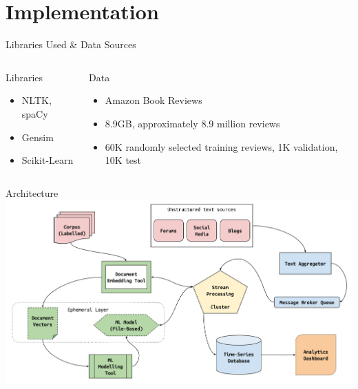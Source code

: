 \documentclass[aspectratio=169]{beamer}
\begin{document}
\section{Implementation}

\begin{frame}{Libraries Used \& Data Sources}
	\begin{columns}[T] %
		\begin{column}{.3\textwidth}
			{\Large Libraries}
			\begin{itemize}
				\item NLTK, spaCy
				\item Gensim
				\item Scikit-Learn
			\end{itemize}
		\end{column}
		\hfill
		\begin{column}{.6\textwidth}
			{\Large Data}
			\begin{itemize}
				\item Amazon Book Reviews
				\item 8.9GB, approximately 8.9 million reviews
				\item 60K randomly selected training reviews, 1K validation, 10K test
			\end{itemize}
		\end{column}
	\end{columns}
\end{frame}

\begin{frame}{Architecture}
	\centering
	\includegraphics[width=.9\textwidth]{images/rapid-rate-system-arch.png}
\end{frame}
\end{document}
